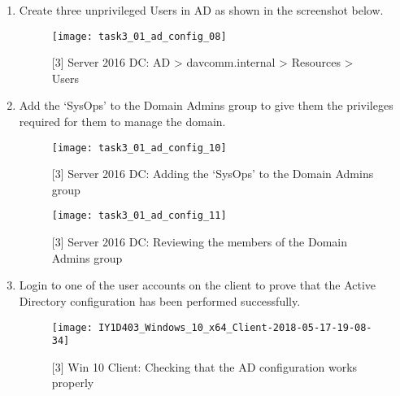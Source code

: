 \begin{enumerate}[series=task3methodology2]
  \item Create three unprivileged Users in AD as shown in the screenshot below.
    \begin{figure}[H]
      \centering
      \captionsetup{skip=2pt}
      \texttt{[image: task3\_01\_ad\_config\_08]}
      \caption{[3] Server 2016 DC: AD > davcomm.internal > Resources > Users}
      \label{fig:task3:ad_config_08}
    \end{figure}
  \item Add the `SysOps' to the Domain Admins group to give them the privileges required for them to manage the domain.
    \begin{figure}[H]
      \centering
      \captionsetup{skip=2pt}
      \texttt{[image: task3\_01\_ad\_config\_10]}
      \caption{[3] Server 2016 DC: Adding the `SysOps' to the Domain Admins group}
      \label{fig:task3:ad_config_10}
    \end{figure}
    \begin{figure}[H]
      \centering
      \captionsetup{skip=2pt}
      \texttt{[image: task3\_01\_ad\_config\_11]}
      \caption{[3] Server 2016 DC: Reviewing the members of the Domain Admins group}
      \label{fig:task3:ad_config_11}
    \end{figure}
  \item Login to one of the user accounts on the client to prove that the Active Directory configuration has been performed successfully.
    \begin{figure}[H]
      \centering
      \captionsetup{skip=2pt}
      \texttt{[image: IY1D403\_Windows\_10\_x64\_Client-2018-05-17-19-08-34]}
      \caption{[3] Win 10 Client: Checking that the AD configuration works properly}
      \label{fig:task3:win10client_05}
    \end{figure}
\end{enumerate}
